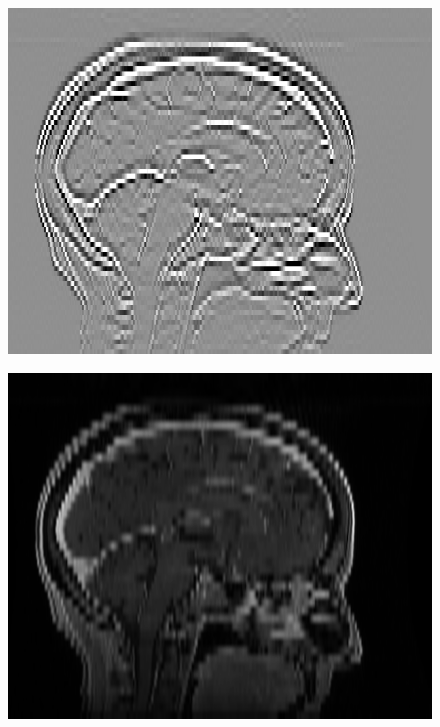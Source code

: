 \documentclass[fleqn,a4paper,oneside,openany]{book}
\begin{document}
\begin{figure}
\begin{minipage}[b]{140pt}
     \label{fig:radiomics_filter_3mm_low_pass}
     \hspace{100pt}
   \end{minipage}
   \begin{minipage}[b]{140pt}
     \centering
     \includegraphics[trim = 0 0 0 0, clip, scale=0.38]{radiomics_filtering/filtered_image_3mm_spacing_hi.png}
     \label{fig:radiomics_filter_3mm_high_pass}
     \hspace{100pt}
   \end{minipage}
   \begin{minipage}[b]{140pt}
     \centering
     \includegraphics[trim = 0 0 0 0, clip, scale=0.38]{radiomics_filtering/filtered_image_5mm_spacing_none.png}

\end{minipage}
\end{figure}
\end{document}
